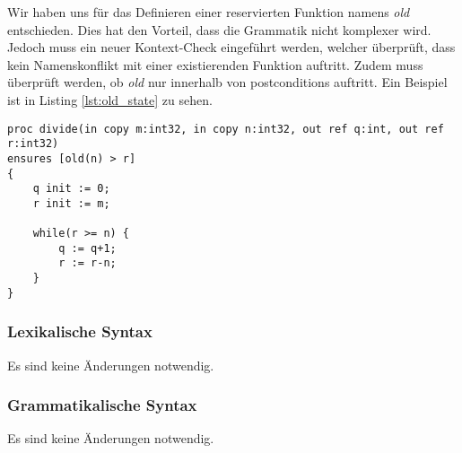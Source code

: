 Wir haben uns für das Definieren einer reservierten Funktion namens \textit{old} 
entschieden. Dies hat den Vorteil, dass die Grammatik nicht komplexer wird. Jedoch 
muss ein neuer Kontext-Check eingeführt werden, welcher überprüft, dass kein Namenskonflikt
mit einer existierenden Funktion auftritt. Zudem muss überprüft werden, ob \textit{old} 
nur innerhalb von postconditions auftritt. Ein Beispiel ist in Listing \ref{lst:old_state} zu sehen.
\begin{lstlisting}[caption=Beispiel eines Zugriffs auf alten Zustand,label={lst:old_state}]
proc divide(in copy m:int32, in copy n:int32, out ref q:int, out ref r:int32)
ensures [old(n) > r]
{
    q init := 0;
    r init := m;

    while(r >= n) {
        q := q+1;
        r := r-n;
    }
}
\end{lstlisting}

\subsubsection{Lexikalische Syntax}
Es sind keine Änderungen notwendig.

\subsubsection{Grammatikalische Syntax}
Es sind keine Änderungen notwendig.


\newpage

